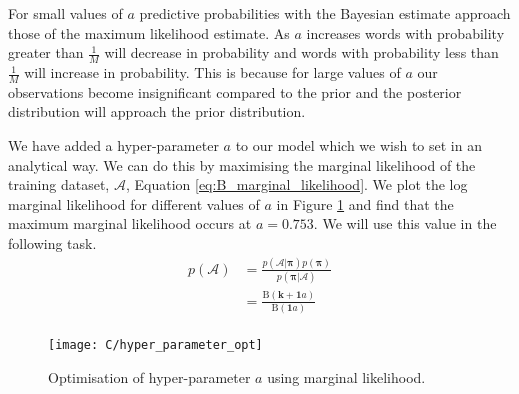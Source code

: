 \documentclass[11pt]{article}
\begin{document}
For small values of $a$ predictive probabilities with the Bayesian estimate approach those of the maximum likelihood estimate. As $a$ increases words with probability greater than $\frac{1}{M}$ will decrease in probability and words with probability less than $\frac{1}{M}$ will increase in probability. This is because for large values of $a$ our observations become insignificant compared to the prior and the posterior distribution will approach the prior distribution.

We have added a hyper-parameter $a$ to our model which we wish to set in an analytical way. We can do this by maximising the marginal likelihood of the training dataset, $\mathcal{A}$, Equation \ref{eq:B_marginal_likelihood}. We plot the log marginal likelihood for different values of $a$ in Figure \ref{fig:C_hyper_parameter_opt} and find that the maximum marginal likelihood occurs at $a = 0.753$. We will use this value in the following task.
\begin{equation}
    \begin{aligned}
        p(\mathcal{A}) &= \frac{p(\mathcal{A} | \boldsymbol{\pi}) p(\boldsymbol{\pi})}{p(\boldsymbol{\pi} | \mathcal{A})} \\
          &= \frac{\text{B}(\boldsymbol{k} + \boldsymbol{1} a)}{\text{B}(\boldsymbol{1} a)} \\ 
    \end{aligned}
    \label{eq:B_marginal_likelihood}
\end{equation}

\begin{figure}
    \centering
    \texttt{[image: C/hyper\_parameter\_opt]}
    \caption{Optimisation of hyper-parameter $a$ using marginal likelihood.}
    \label{fig:C_hyper_parameter_opt}
\end{figure}
\end{document}
